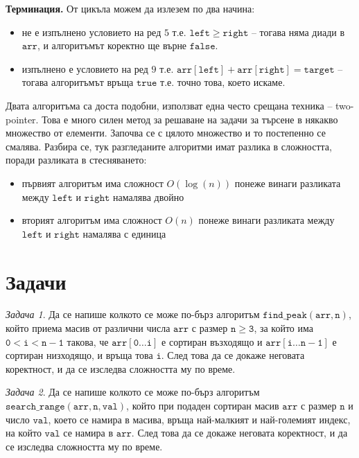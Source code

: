 \documentclass{article}
\theoremstyle{definition}
\theoremstyle{plain}
\theoremstyle{remark}
\newtheorem{problem}{Задача}
\theoremstyle{definition}
\begin{document}
\textbf{Терминация.}
От цикъла можем да излезем по два начина:
\begin{itemize}
    \item не е изпълнено условието на ред $5$ т.е. $\mathtt{left \geq right}$ -- тогава няма диади в $\mathtt{arr}$, и алгоритъмът коректно ще върне $\mathtt{false}$.
    \item изпълнено е условието на ред $9$ т.е. $\mathtt{arr[left] + arr[right] = target}$ -- тогава алгоритъмът връща $\mathtt{true}$ т.е. точно това, което искаме.
\end{itemize}

Двата алгоритъма са доста подобни, използват една често срещана техника -- two-pointer.
Това е много силен метод за решаване на задачи за търсене в някакво множество от елементи.
Започва се с цялото множество и то постепенно се смалява.
Разбира се, тук разгледаните алгоритми имат разлика в сложността, поради разликата в стесняването:
\begin{itemize}
    \item първият алгоритъм има сложност $O(\log(n))$ понеже винаги разликата между $\mathtt{left}$ и $\mathtt{right}$ намалява двойно
    \item вторият алгоритъм има сложност $O(n)$ понеже винаги разликата между $\mathtt{left}$ и $\mathtt{right}$ намалява с единица
\end{itemize}

\section*{Задачи}

\begin{problem}
Да се напише колкото се може по-бърз алгоритъм $\mathtt{find\_peak(arr, n)}$, който приема масив от различни числа $\mathtt{arr}$ с размер $\mathtt{n \geq 3}$, за който има $\mathtt{0 < i < n - 1}$ такова, че $\mathtt{arr[0 \dots i]}$ е сортиран възходящо и $\mathtt{arr[i \dots n - 1]}$ е сортиран низходящо, и връща това $\mathtt{i}$.
След това да се докаже неговата коректност, и да се изследва сложността му по време.
\end{problem}

\begin{problem}
Да се напише колкото се може по-бърз алгоритъм $\mathtt{search\_range(arr, n, val)}$, който при подаден сортиран масив $\mathtt{arr}$ с размер $\mathtt{n}$ и число $\mathtt{val}$, което се намира в масива, връща най-малкият и най-големият индекс, на който $\mathtt{val}$ се намира в $\mathtt{arr}$.
След това да се докаже неговата коректност, и да се изследва сложността му по време.
\end{problem}
\end{document}
